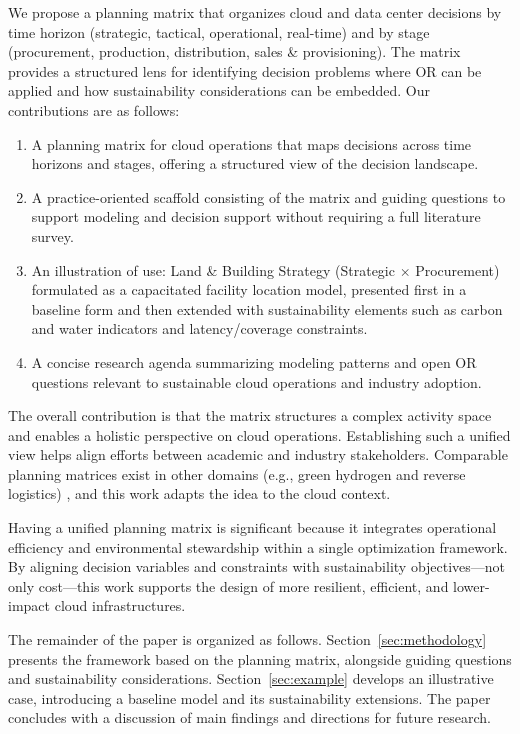 \documentclass[pdflatex,sn-mathphys-num]{sn-jnl}
\theoremstyle{thmstyleone}
\theoremstyle{thmstyletwo}
\theoremstyle{thmstylethree}
\begin{document}
We propose a planning matrix that organizes cloud and data center decisions by time horizon (strategic, tactical, operational, real-time) and by stage (procurement, production, distribution, sales \& provisioning). The matrix provides a structured lens for identifying decision problems where OR can be applied and how sustainability considerations can be embedded. 
Our contributions are as follows:
\begin{enumerate}
  \item[(i)] A planning matrix for cloud operations that maps decisions across time horizons and stages, offering a structured view of the decision landscape.
  \item[(ii)] A practice-oriented scaffold consisting of the matrix and guiding questions to support modeling and decision support without requiring a full literature survey.
  \item[(iii)] An illustration of use: Land \& Building Strategy (Strategic $\times$ Procurement) formulated as a capacitated facility location model, presented first in a baseline form and then extended with sustainability elements such as carbon and water indicators and latency/coverage constraints.
  \item[(iv)] A concise research agenda summarizing modeling patterns and open OR questions relevant to sustainable cloud operations and industry adoption.
\end{enumerate}

The overall contribution is that the matrix structures a complex activity space and enables a holistic perspective on cloud operations. Establishing such a unified view helps align efforts between academic and industry stakeholders. Comparable planning matrices exist in other domains (e.g., green hydrogen and reverse logistics) \cite{}, and this work adapts the idea to the cloud context.

Having a unified planning matrix is significant because it integrates operational efficiency and environmental stewardship within a single optimization framework. By aligning decision variables and constraints with sustainability objectives—not only cost—this work supports the design of more resilient, efficient, and lower-impact cloud infrastructures.

The remainder of the paper is organized as follows. Section~\ref{sec:methodology} presents the framework based on the planning matrix, alongside guiding questions and sustainability considerations. Section~\ref{sec:example} develops an illustrative case, introducing a baseline model and its sustainability extensions. The paper concludes with a discussion of main findings and directions for future research.
\end{document}
